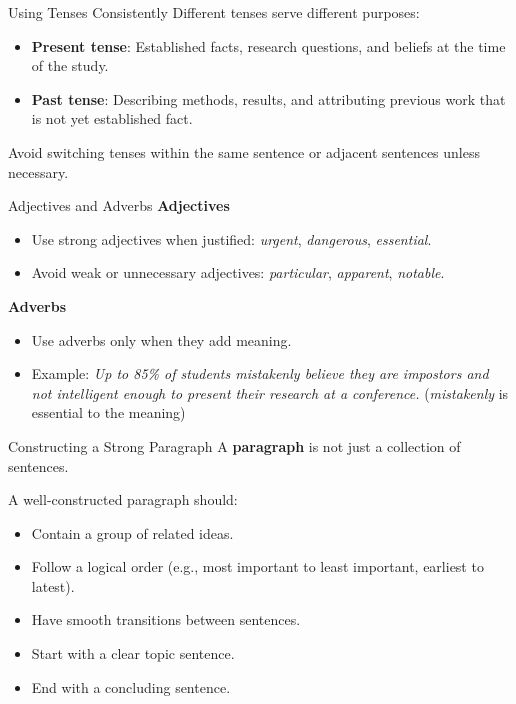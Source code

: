 \begin{frame}{Using Tenses Consistently}
  Different tenses serve different purposes: \pause
  \begin{itemize}
    \item \textbf{Present tense}: Established facts, research questions, and beliefs at the time of the study. \pause
    \item \textbf{Past tense}: Describing methods, results, and attributing previous work that is not yet established fact.
  \end{itemize}

  Avoid switching tenses within the same sentence or adjacent sentences unless necessary.
\end{frame}

\begin{frame}{Adjectives and Adverbs}
  \textbf{Adjectives}
  \begin{itemize}
    \item Use strong adjectives when justified: \textit{urgent}, \textit{dangerous}, \textit{essential}.
    \item Avoid weak or unnecessary adjectives: \textit{particular}, \textit{apparent}, \textit{notable}.
  \end{itemize}
  \pause
  \textbf{Adverbs}
  \begin{itemize}
    \item Use adverbs only when they add meaning.
    \item Example: \textit{Up to 85\% of students mistakenly believe they are
      impostors and not intelligent enough to present their research at a
      conference.} (\textit{mistakenly} is essential to the meaning)
  \end{itemize}
\end{frame}

\begin{frame}{Constructing a Strong Paragraph}
  A \textbf{paragraph} is not just a collection of sentences.
  \pause

  A well-constructed paragraph should:
  \begin{itemize}
    \item Contain a group of related ideas. \pause
    \item Follow a logical order (e.g., most important to least important, earliest to latest). \pause
    \item Have smooth transitions between sentences. \pause
    \item Start with a clear topic sentence. \pause
    \item End with a concluding sentence.
  \end{itemize}
\end{frame}

